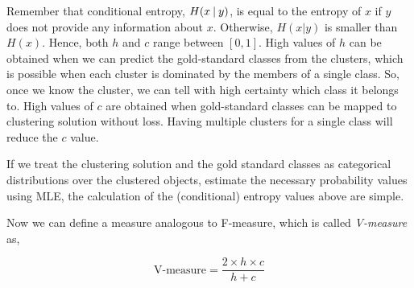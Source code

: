 Remember that conditional entropy, $H(x\:\vert\:{}y)$, is equal to
the entropy of $x$ if $y$ does not provide any information about $x$.
Otherwise, $H(x|y)$ is smaller than $H(x)$.
Hence, both $h$ and $c$ range between $[0,1]$.
High values of $h$ can be obtained
when we can predict the gold-standard classes from the clusters,
which is possible when each cluster is dominated
by the members of a single class.
So, once we know the cluster,
we can tell with high certainty which class it belongs to.
High values of $c$ are obtained when gold-standard classes can be 
mapped to clustering solution without loss.
Having multiple clusters for a single class will reduce the $c$ value.

If we treat the clustering solution and the gold standard classes
as categorical distributions over the clustered objects,
estimate the necessary probability values using MLE,
the calculation of the (conditional) entropy values above are simple.

Now we can define a measure analogous to F-measure,
which is called \emph{V-measure} as,

\[
  \text{V-measure} = \frac{2\times{}h\times{}c}{h+c}
\]

\begin{marginfigure}
  \caption{\label{fig:v-measure}%
    An example clustering solution with gold-standard labels
    (represented as shapes).
    Cluster 2 is pure, or fully homogeneous.
    The label represented by triangle is completely contained in cluster 1.
    The actual calculations of homogeneity, completeness and V-measure
    scores are left as an exercise.
  }
\end{marginfigure}

